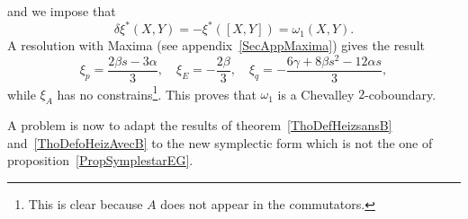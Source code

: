 and we impose that
\begin{equation}
  \delta\xi^*(X,Y)=-\xi^*([X,Y])=\omega_{1}(X,Y).
\end{equation}
A resolution with Maxima (see appendix~\ref{SecAppMaxima}) gives the result
\begin{equation}  \label{EqSolxialgun}
\xi_{p}=\frac{ 2\beta s-3\alpha }{ 3 },\quad\xi_{E}=-\frac{ 2\beta }{ 3 },\quad\xi_{q}=-\frac{ 6\gamma+8 \beta s^{2}-12\alpha s }{ 3 },
\end{equation}
while $\xi_{A}$ has no constrains\footnote{This is clear because $A$ does not appear in the commutators.}. This proves that $\omega_{1}$ is a Chevalley $2$-coboundary.

A problem is now to adapt the results of theorem~\ref{ThoDefHeizsansB} and~\ref{ThoDefoHeizAvecB} to the new symplectic form which is not the one of proposition~\ref{PropSymplestarEG}.

